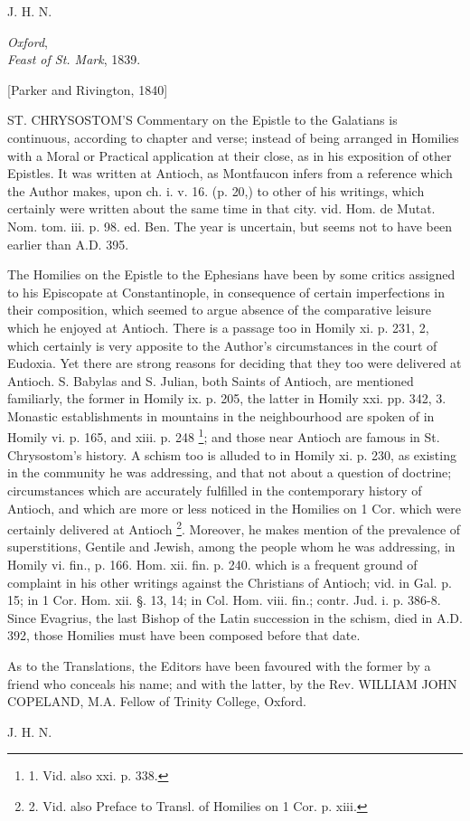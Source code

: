 J. H. N.

\emph{Oxford},\emph{}\\
\emph{Feast of St. Mark}, 1839.



[Parker and Rivington, 1840]


ST.
CHRYSOSTOM'S Commentary on the Epistle to the Galatians is continuous, according to
chapter and verse; instead of being arranged in Homilies with a Moral
or Practical application at their close, as in his exposition of other
Epistles. It was written at Antioch, as Montfaucon infers from a
reference which the Author makes, upon ch. i. v. 16. (p. 20,) to other
of his writings, which certainly were written about the same time in
that city. vid. Hom. de Mutat. Nom. tom. iii. p. 98. ed. Ben. The year
is uncertain, but seems not to have been earlier than A.D. 395.

The
Homilies on the Epistle to the Ephesians have been by some critics
assigned to his Episcopate at Constantinople, in consequence of
certain imperfections in their composition, which seemed to argue
absence of the comparative leisure which he enjoyed at Antioch. There
is a passage too in Homily xi. p. 231, 2, which certainly is very
apposite to the Author's circumstances in the court of Eudoxia. Yet
there are strong reasons for deciding that they too were delivered at
Antioch. S. Babylas and S. Julian, both Saints of Antioch, are
mentioned familiarly, the former in Homily ix. p. 205, the latter in
Homily xxi. pp. 342, 3. Monastic establishments in mountains in the
neighbourhood are spoken of in Homily vi. p. 165, and xiii. p. 248 \footnote{1. Vid.
also xxi. p. 338.}; and those near Antioch are famous in St. Chrysostom's history.
A schism too is alluded to in Homily xi. p. 230, as existing in the
community he was addressing, and that not about a question of
doctrine; circumstances which are accurately fulfilled in the
contemporary history of Antioch, and which are more or less noticed in
the Homilies on 1 Cor. which were certainly delivered at Antioch \footnote{2.
Vid. also Preface to Transl. of Homilies on 1 Cor. p. xiii.}. Moreover, he makes mention of the prevalence of superstitions,
Gentile and Jewish, among the people whom he was addressing, in Homily
vi. fin., p. 166. Hom. xii. fin. p. 240. which is a frequent ground of
complaint in his other writings against the Christians of Antioch; vid.
in Gal. p. 15; in 1 Cor. Hom. xii. §. 13, 14; in Col. Hom. viii.
fin.; contr. Jud. i. p. 386-8. Since Evagrius, the last Bishop of the
Latin succession in the schism, died in A.D.
392, those Homilies must have been composed before that date.

As to the
Translations, the Editors have been favoured with the former by a
friend who conceals his name; and with the latter, by the Rev. WILLIAM
JOHN COPELAND,
M.A. Fellow of Trinity College, Oxford.

J. H. N.
